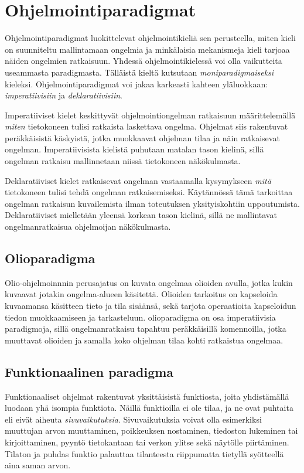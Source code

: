 \chapter{Ohjelmointiparadigmat} \label{Ohjelmointiparadigmat}
Ohjelmointiparadigmat luokittelevat ohjelmointikieliä sen perusteella, miten kieli on suunniteltu mallintamaan ongelmia ja minkälaisia mekanismeja kieli tarjoaa näiden ongelmien ratkaisuun. Yhdessä ohjelmointikielessä voi olla vaikutteita useammasta paradigmasta. Tälläistä kieltä kutsutaan \textit{moniparadigmaiseksi} kieleksi. Ohjelmointiparadigmat voi jakaa karkeasti kahteen yläluokkaan: \textit{imperatiivisiin} ja \textit{deklaratiivisiin}.
\cite[Luku 6]{principlesAndParadigms}

Imperatiiviset kielet keskittyvät ohjelmointiongelman ratkaisuun määrittelemällä \textit{miten} tietokoneen tulisi ratkaista laskettava ongelma. Ohjelmat siis rakentuvat peräkkäisistä käskyistä, jotka muokkaavat ohjelman tilaa ja näin ratkaisevat ongelman. Imperatiivisista kielistä puhutaan matalan tason kielinä, sillä ongelman ratkaisu mallinnetaan niissä tietokoneen näkökulmasta.
\cite[Luku 1]{programmingLanguagePragmatics} 

Deklaratiiviset kielet ratkaisevat ongelman vastaamalla kysymykseen \textit{mitä} tietokoneen tulisi tehdä ongelman ratkaisemiseksi. Käytännössä tämä tarkoittaa ongelman ratkaisun kuvailemista ilman toteutuksen yksityiskohtiin uppoutumista. Deklaratiiviset mielletään yleensä korkean tason kielinä, sillä ne mallintavat ongelmanratkaisua ohjelmoijan näkökulmasta.
\cite[Luku 1]{programmingLanguagePragmatics}


\section{Olioparadigma}
Olio-ohjelmoinnnin perusajatus on kuvata ongelmaa olioiden avulla, jotka kukin kuvaavat jotakin ongelma-alueen käsitettä. Olioiden tarkoitus on kapseloida kuvaamansa käsitteen tieto ja tila sisäänsä, sekä tarjota operaatioita kapseloidun tiedon muokkaamiseen ja tarkasteluun. olioparadigma on osa imperatiivisia paradigmoja, sillä ongelmanratkaisu tapahtuu peräkkäisillä komennoilla, jotka muuttavat olioiden ja samalla koko ohjelman tilaa kohti ratkaistua ongelmaa. \cite[Luku 1]{programmingLanguagePragmatics}
\cite[Luku 10]{principlesAndParadigms}


\section{Funktionaalinen paradigma}
Funktionaaliset ohjelmat rakentuvat yksittäisistä funktiosta, joita yhdistämällä luodaan yhä isompia funktiota. Näillä funktioilla ei ole tilaa, ja ne ovat puhtaita eli eivät aiheuta \textit{sivuvaikutuksia}. Sivuvaikutuksia voivat olla esimerkiksi muuttujan arvon muuttaminen, poikkeuksen nostaminen, tiedoston lukeminen tai kirjoittaminen, pyyntö tietokantaan tai verkon ylitse sekä näytölle piirtäminen. Tilaton ja puhdas funktio palauttaa tilanteesta riippumatta tietyllä syötteellä aina saman arvon. \cite[Luku 1]{functionalProgrammingInScala}

